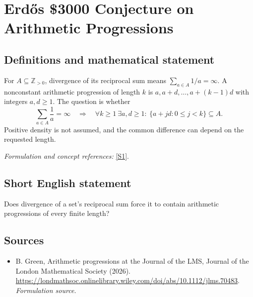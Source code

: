 \documentclass[11pt]{article}
\begin{document}
\section*{\texorpdfstring{Erdős \$3000 Conjecture on Arithmetic Progressions}{Erdős \$3000 Conjecture on Arithmetic Progressions}}\label{statement}
\subsection{Definitions and mathematical statement}
For $A\subseteq{\mathbb{Z}}_{>0}$, divergence of its reciprocal sum means $\sum_{a\in A}1/a=\infty$. A nonconstant arithmetic progression of length $k$ is $a,a+d,\ldots,a+(k-1)d$ with integers $a,d\ge1$. The question is whether
\[
 \sum_{a\in A}\frac1a=\infty\quad\Longrightarrow\quad
 \forall k\ge1\ \exists a,d\ge1:\ \{a+jd:0\le j<k\}\subseteq A.
\]
Positive density is not assumed, and the common difference can depend on the requested length.
\par\smallskip\textit{Formulation and concept references:} \href{https://londmathsoc.onlinelibrary.wiley.com/doi/abs/10.1112/jlms.70483}{[S1]}.

\subsection{Short English statement}
Does divergence of a set's reciprocal sum force it to contain arithmetic progressions of every finite length?
\subsection{Sources}
\begin{itemize}
\item[S1]B. Green, Arithmetic progressions at the Journal of the LMS, Journal of the London Mathematical Society (2026).
\url{https://londmathsoc.onlinelibrary.wiley.com/doi/abs/10.1112/jlms.70483}.
\textit{Formulation source.}
\end{itemize}
\end{document}
